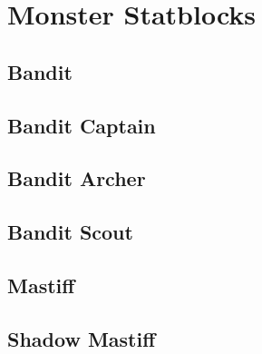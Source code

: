 \makeatletter
{}%
\makeatother

\chapter*{Monster Statblocks}

\section*{Bandit}
\label{monster:Bandit}

\section*{Bandit Captain}
\label{monster:BanditCaptain}

\section*{Bandit Archer}
\label{monster:BanditArcher}

\section*{Bandit Scout}
\label{monster:BanditScout}

\section*{Mastiff}
\label{monster:Mastiff}

\section*{Shadow Mastiff}
\label{monster:ShadowMastiff}


